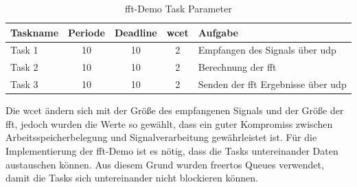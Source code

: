 \documentclass[../EDF Master Thesis.tex]{subfiles}
\begin{document}
            \begin{table}[ht!]
                \centering
                \begin{tabular}{l|c|c|c|l}
                    Taskname & Periode & Deadline & \ac{wcet} & Aufgabe \\
                    \hline
                    Task 1 & 10 & 10 & 2 & Empfangen des Signals über \ac{udp}\\
                    Task 2 & 10 & 10 & 2 & Berechnung der \ac{fft}\\
                    Task 3 & 10 & 10 & 2 & Senden der \ac{fft} Ergebnisse über \ac{udp}
                \end{tabular}
                \caption{\ac{fft}-Demo Task Parameter}
                \label{table:fft_demo_task_parameter}
            \end{table}

            Die \ac{wcet} ändern sich mit der Größe des empfangenen Signals und der Größe der \ac{fft}, jedoch wurden die Werte so gewählt, dass ein guter Kompromiss zwischen Arbeitsspeicherbelegung und Signalverarbeitung gewährleistet ist.
            Für die Implementierung der \ac{fft}-Demo ist es nötig, dass die Tasks untereinander Daten austauschen können.
            Aus diesem Grund wurden \ac{freertos} Queues verwendet, damit die Tasks sich untereinander nicht blockieren können.
\end{document}

